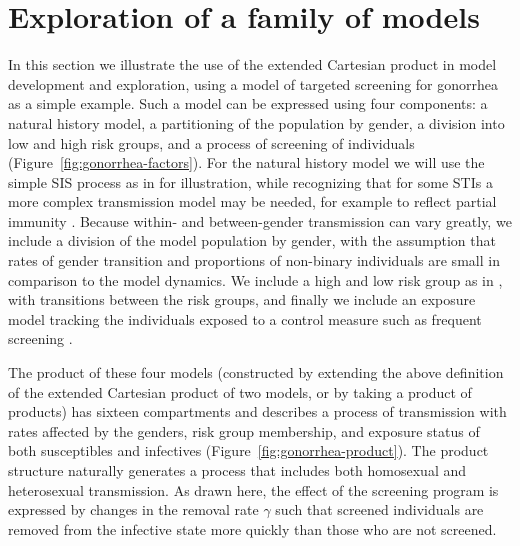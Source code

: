 \documentclass[review]{elsarticle}
\begin{document}
\section{Exploration of a family of models}



In this section we illustrate the use of the extended Cartesian product
in model development and exploration,
using a model of targeted screening for gonorrhea as a
simple example.
Such a model can be expressed using four components:
a natural history model,
a partitioning of the population by gender,
a division into low and high risk groups,
and a process of screening of individuals
(Figure~\ref{fig:gonorrhea-factors}).
For the natural history model we will use the simple SIS process
as in \cite{lajmanovich-yorke76} for illustration,
while recognizing that for some STIs a more complex transmission
model may be needed, for example to reflect partial immunity
\cite{brunham2005unexpected}.
Because within- and between-gender transmission can vary greatly,
we include a division of the model population by gender,
with the assumption that rates of gender transition and
proportions of non-binary individuals are small in comparison
to the model dynamics.
We include a high and low risk group as in \cite{hethcote-yorke1984},
with transitions between the risk groups,
and finally we include an exposure model tracking the individuals
exposed to a control measure such as frequent screening \cite{lee2016sexually}.

The product of these four models
(constructed by extending the above definition of the extended Cartesian
product of two models, or by taking a product of products)
has sixteen compartments and describes a process of transmission
with rates affected by the genders, risk group membership,
and exposure status of both susceptibles and infectives
(Figure~\ref{fig:gonorrhea-product}).
The product structure naturally generates a process that includes
both homosexual and heterosexual transmission.
As drawn here, the effect of the screening program is expressed
by changes in the removal rate $\gamma$
such that screened individuals are removed from the infective state
more quickly than those who are not screened.
\end{document}
